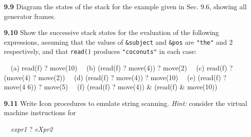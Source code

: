 \textbf{9.9} Diagram the states of the stack for the example given in
Sec. 9.6, showing all generator frames.

\textbf{9.10} Show the successive stack states for the evaluation of the
following expressions, assuming that the values of \texttt{\&subject}
and \texttt{\&pos} are \texttt{"the"} and
2 respectively, and that \texttt{read()} produces
\texttt{"coconuts"} in each case:

\ \ (a) read(f) ? move(10)\newline
\ \ (b) (read(f) ? move(4)) ? move(2)\newline
\ \ (c) read(f) ? (move(4) ? move(2))\newline
\ \ (d) (read(f) ? move(4)) ? move(10)\newline
\ \ (e) (read(f) ? move(4 {\textbar} 6)) ? move(5)\newline
\ \ (f) (read(f) ? move(4)) \& (read(f) \& move(10))

\textbf{9.11} Write Icon procedures to emulate string
scanning. \textit{Hint:} consider the virtual machine instructions for

{\ttfamily\mdseries
\textit{\ \ expr1 }? \textit{eXpr2}}
